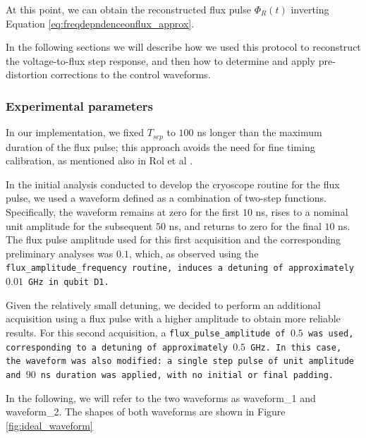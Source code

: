 At this point, we can obtain the reconstructed flux pulse $\Phi_R(t)$ inverting Equation \ref{eq:freqdepndenceonflux_approx}.

In the following sections we will describe how we used this protocol to reconstruct the voltage-to-flux step response, and then how to determine and apply pre-distortion corrections to the control waveforms.

\subsubsection{Experimental parameters}
In our implementation, we fixed $T_{sep}$ to $100$ ns longer than the maximum duration of the flux pulse; this approach avoids the need for fine timing calibration, as mentioned also in Rol et al \cite{rol_time-domain_2020}.

In the initial analysis conducted to develop the cryoscope routine for the flux pulse, we used a waveform defined as a combination of two-step functions. 
Specifically, the waveform remains at zero for the first $10$ ns, rises to a nominal unit amplitude for the subsequent $50$ ns, and returns to zero for the final $10$ ns.\\
The flux pulse amplitude used for this first acquisition and the corresponding preliminary analyses was $0.1$, which, as observed using the \tt{flux\_amplitude\_frequency} routine, induces a detuning of approximately $0.01$ GHz in qubit \tt{D1}. 

Given the relatively small detuning, we decided to perform an additional acquisition using a flux pulse with a higher amplitude to obtain more reliable results.
For this second acquisition, a \tt{flux\_pulse\_amplitude} of $0.5$ was used, corresponding to a detuning of approximately $0.5$ GHz. 
In this case, the waveform was also modified: a single step pulse of unit amplitude and $90$ ns duration was applied, with no initial or final padding.

In the following, we will refer to the two waveforms as waveform\_1 and waveform\_2. 
The shapes of both waveforms are shown in Figure \ref{fig:ideal_waveform}

